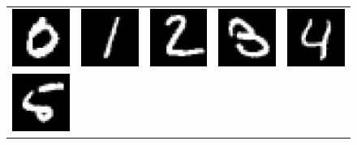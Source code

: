 \documentclass[twocolumn]{article} %
\begin{document}
\begin{figure}[htbp]
  \centering
  \setlength{\tabcolsep}{2pt}
  \renewcommand{\arraystretch}{0}
  \begin{tabular}{ccccc} %
    \includegraphics[width=0.18\linewidth]{figures/digits/digits_0.png} & %
    \includegraphics[width=0.18\linewidth]{figures/digits/digits_1.png} & %
    \includegraphics[width=0.18\linewidth]{figures/digits/digits_2.png} & %
    \includegraphics[width=0.18\linewidth]{figures/digits/digits_3.png} & %
    \includegraphics[width=0.18\linewidth]{figures/digits/digits_4.png} \\ %
    \includegraphics[width=0.18\linewidth]{figures/digits/digits_5.png} & %

\end{tabular}
\end{figure}
\end{document}
